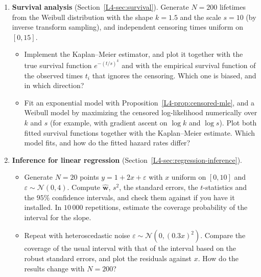 \begin{enumerate}[label=\textbf{P\arabic*.}, leftmargin=*]
    \item \textbf{Survival analysis} (Section~\ref{L4-sec:survival}). Generate $N = 200$ lifetimes from the Weibull distribution with the shape $k = 1.5$ and the scale $s = 10$ (by inverse transform sampling), and independent censoring times uniform on $[0, 15]$.
    \begin{itemize}
        \item Implement the Kaplan--Meier estimator, and plot it together with the true survival function $e^{-(t/s)^k}$ and with the empirical survival function of the observed times $t_i$ that ignores the censoring. Which one is biased, and in which direction?
        \item Fit an exponential model with Proposition~\ref{L4-prop:censored-mle}, and a Weibull model by maximizing the censored log-likelihood numerically over $k$ and $s$ (for example, with gradient ascent on $\log k$ and $\log s$). Plot both fitted survival functions together with the Kaplan--Meier estimate. Which model fits, and how do the fitted hazard rates differ?
    \end{itemize}

    \item \textbf{Inference for linear regression} (Section~\ref{L4-sec:regression-inference}).
    \begin{itemize}
        \item Generate $N = 20$ points $y = 1 + 2x + \varepsilon$ with $x$ uniform on $[0, 10]$ and $\varepsilon \sim \mathcal{N}(0, 4)$. Compute $\hat{\mathbf{w}}$, $s^2$, the standard errors, the $t$-statistics and the $95\%$ confidence intervals, and check them against  if you have it installed. In $10\,000$ repetitions, estimate the coverage probability of the interval for the slope.
        \item Repeat with heteroscedastic noise $\varepsilon \sim \mathcal{N}(0, (0.3x)^2)$. Compare the coverage of the usual interval with that of the interval based on the robust standard errors, and plot the residuals against $x$. How do the results change with $N = 200$?
    \end{itemize}
\end{enumerate}
\endgroup
